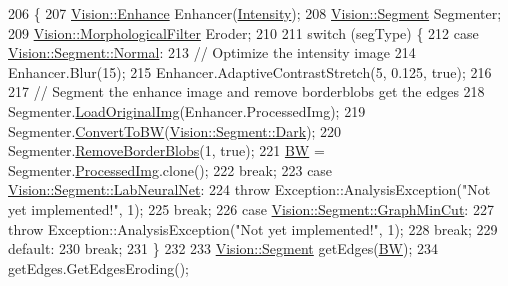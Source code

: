 \begin{DoxyCode}
206                                                                    \{
207   \hyperlink{class_vision_1_1_enhance}{Vision::Enhance} Enhancer(\hyperlink{class_soil_analyzer_1_1_soil_a6f56200f2722df5b849d8cddd094c852}{Intensity});
208   \hyperlink{class_vision_1_1_segment}{Vision::Segment} Segmenter;
209   \hyperlink{class_vision_1_1_morphological_filter}{Vision::MorphologicalFilter} Eroder;
210 
211   \textcolor{keywordflow}{switch} (segType) \{
212   \textcolor{keywordflow}{case} \hyperlink{class_vision_1_1_segment_af3a2b992526eac54bca53e34cf2db4daae000cfc8d629752d6cdbba0d3d750184}{Vision::Segment::Normal}:
213     \textcolor{comment}{// Optimize the intensity image}
214     Enhancer.Blur(15);
215     Enhancer.AdaptiveContrastStretch(5, 0.125, \textcolor{keyword}{true});
216 
217     \textcolor{comment}{// Segment the enhance image and remove borderblobs get the edges}
218     Segmenter.\hyperlink{class_vision_1_1_segment_a8b5edc7f5a69d961e47f61a2191b8745}{LoadOriginalImg}(Enhancer.ProcessedImg);
219     Segmenter.\hyperlink{class_vision_1_1_segment_a4272ceb22f9cb20c6f65d9536149d3c0}{ConvertToBW}(\hyperlink{class_vision_1_1_segment_ac3ddf2c72ee6333007510b680db1e7dda962a0c0955809f63df036dbd41824c54}{Vision::Segment::Dark});
220     Segmenter.\hyperlink{class_vision_1_1_segment_a65a50340b5a1a0fb08a1b5749b7145b6}{RemoveBorderBlobs}(1, \textcolor{keyword}{true});
221     \hyperlink{class_soil_analyzer_1_1_soil_ae11b578192ebae3165f75c09d6116f74}{BW} = Segmenter.\hyperlink{class_vision_1_1_image_processing_aa7d65742882cd1b2a1e4e9cb68809211}{ProcessedImg}.clone();
222     \textcolor{keywordflow}{break};
223   \textcolor{keywordflow}{case} \hyperlink{class_vision_1_1_segment_af3a2b992526eac54bca53e34cf2db4daa6ddef558061ee58899a362608a5b163b}{Vision::Segment::LabNeuralNet}:
224     \textcolor{keywordflow}{throw} Exception::AnalysisException(\textcolor{stringliteral}{"Not yet implemented!"}, 1);
225     \textcolor{keywordflow}{break};
226   \textcolor{keywordflow}{case} \hyperlink{class_vision_1_1_segment_af3a2b992526eac54bca53e34cf2db4daa0291c0ff93e52e8e78f86698b0288353}{Vision::Segment::GraphMinCut}:
227     \textcolor{keywordflow}{throw} Exception::AnalysisException(\textcolor{stringliteral}{"Not yet implemented!"}, 1);
228     \textcolor{keywordflow}{break};
229   \textcolor{keywordflow}{default}:
230     \textcolor{keywordflow}{break};
231   \}
232 
233   \hyperlink{class_vision_1_1_segment}{Vision::Segment} getEdges(\hyperlink{class_soil_analyzer_1_1_soil_ae11b578192ebae3165f75c09d6116f74}{BW});
234   getEdges.GetEdgesEroding();

\end{DoxyCode}
